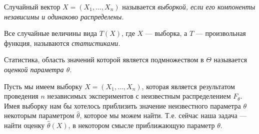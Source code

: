 \begin{definition}
    Случайный вектор $X = (X_1, \ldots, X_n)$ называется \it{выборкой}, если его компоненты независимы и одинаково распределены.
\end{definition}
\begin{definition}
    Все случайные величины вида $T(X)$, где $X$ --- выборка, а $T$ --- произвольная функция, называются \it{статистиками}.
\end{definition}
\begin{definition}
    Статистика, область значений которой является подмножеством в $\Theta$ называется \it{оценкой параметра} $\theta$.
\end{definition}
Пусть мы имеем выборку $X = (X_1, \ldots, X_n)$, которая является результатом проведения $n$ независимых экспериментов с
неизвестным распределением $F_{\theta}$. Имея выборку нам бы хотелось приблизить значение неизвестного параметра $\theta$
некоторым параметром $\hat{\theta}$, которое мы можем найти. Т.е. сейчас наша задача --- найти оценку $\hat{\theta}(X)$,
в некотором смысле приближающую параметр $\theta$.

